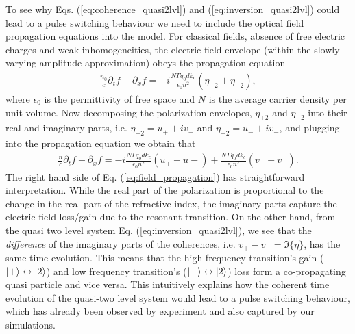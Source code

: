 \documentclass[]{spie}  %
\def\p{\partial}
\begin{document}
To see why Eqs. (\ref{eq:coherence_quasi2lvl}) and (\ref{eq:inversion_quasi2lvl}) could lead to a pulse switching behaviour we need to include the optical field propagation equations into the model. For classical fields, absence of free electric charges and weak inhomogeneities, the electric field envelope (within the slowly varying amplitude approximation) obeys the propagation equation
\begin{align}
	\frac{n_0}{c} \p_t f - \p_x f = -i\frac{N \Gamma q_0d k_c}{\epsilon_0 n^2}(\eta_{+2}+\eta_{-2}),
\end{align}
where $\epsilon_0$ is the permittivity of free space and $N$ is the average carrier density per unit volume. Now decomposing the polarization envelopes, $\eta_{+2}$ and $\eta_{-2}$ into their real and imaginary parts, i.e. $\eta_{+2} = u_{+}+iv_{+}$ and $\eta_{-2} = u_{-}+iv_{-}$, and plugging into the propagation equation we obtain that
\begin{align}
\label{eq:field_propagation}
\frac{n}{c} \p_t f - \p_x f = -i\frac{N \Gamma q_0d k_c}{\epsilon_0 n^2}(u_{+}+u{-}) + \frac{N \Gamma q_0d k_c}{\epsilon_0 n^2}(v_{+}+v_{-}).
\end{align}
The right hand side of Eq. (\ref{eq:field_propagation}) has straightforward interpretation. While the real part of the polarization is proportional to the change in the real part of the refractive index, the imaginary parts capture the electric field loss/gain due to the resonant transition. On the other hand, from the quasi two level system Eq. (\ref{eq:inversion_quasi2lvl}), we see that the \emph{difference} of the imaginary parts of the coherences, i.e. $v_{+}-v_{-} = \Im\{\eta\}$, has the same time evolution. This means that the high frequency transition's gain ($\ket{+}\leftrightarrow\ket{2}$) and low frequency transition's ($\ket{-}\leftrightarrow\ket{2}$) loss form a co-propagating quasi particle and vice versa. This intuitively explains how the coherent time evolution of the quasi-two level system would lead to a pulse switching behaviour, which has already been observed by experiment\cite{burghoff2015evaluating} and also captured by our simulations.
 
\end{document}
